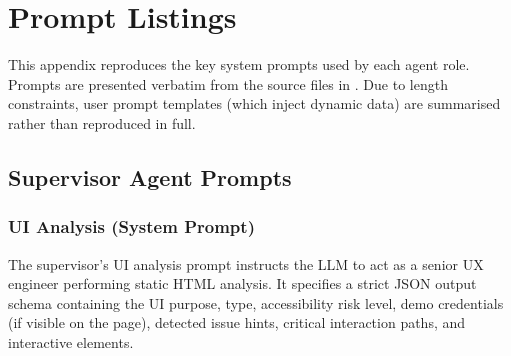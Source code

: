 \chapter{Prompt Listings}
\label{app:prompts}

This appendix reproduces the key system prompts used by each agent role. Prompts are presented verbatim from the source files in . Due to length constraints, user prompt templates (which inject dynamic data) are summarised rather than reproduced in full.


\section{Supervisor Agent Prompts}
\label{app:supervisor-prompts}

\subsection{UI Analysis (System Prompt)}

The supervisor's UI analysis prompt instructs the LLM to act as a senior UX engineer performing static HTML analysis. It specifies a strict JSON output schema containing the UI purpose, type, accessibility risk level, demo credentials (if visible on the page), detected issue hints, critical interaction paths, and interactive elements.

